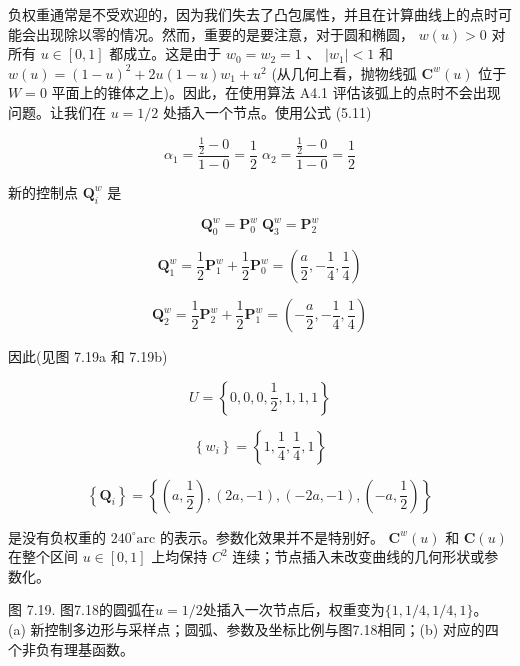 \documentclass[../main.tex]{subfiles}
\begin{document}
负权重通常是不受欢迎的，因为我们失去了凸包属性，并且在计算曲线上的点时可能会出现除以零的情况。然而，重要的是要注意，对于圆和椭圆， \(w\left( u\right)  > 0\) 对所有 \(u \in  \left\lbrack  {0,1}\right\rbrack\) 都成立。这是由于 \({w}_{0} = {w}_{2} = 1\) 、 \(\left| {w}_{1}\right|  < 1\) 和 \(w\left( u\right)  = {\left( 1 - u\right) }^{2} + {2u}\left( {1 - u}\right) {w}_{1} + {u}^{2}\) (从几何上看，抛物线弧 \({\mathbf{C}}^{w}\left( u\right)\) 位于 \(W = 0\) 平面上的锥体之上)。因此，在使用算法 A4.1 评估该弧上的点时不会出现问题。让我们在 \(u = 1/2\) 处插入一个节点。使用公式 (5.11)

\[
{\alpha }_{1} = \frac{\frac{1}{2} - 0}{1 - 0} = \frac{1}{2}\;{\alpha }_{2} = \frac{\frac{1}{2} - 0}{1 - 0} = \frac{1}{2}
\]



新的控制点 \({\mathbf{Q}}_{i}^{w}\) 是

\[
{\mathbf{Q}}_{0}^{w} = {\mathbf{P}}_{0}^{w}\;{\mathbf{Q}}_{3}^{w} = {\mathbf{P}}_{2}^{w}
\]

\[
{\mathbf{Q}}_{1}^{w} = \frac{1}{2}{\mathbf{P}}_{1}^{w} + \frac{1}{2}{\mathbf{P}}_{0}^{w} = \left( {\frac{a}{2}, - \frac{1}{4},\frac{1}{4}}\right)
\]

\[
{\mathbf{Q}}_{2}^{w} = \frac{1}{2}{\mathbf{P}}_{2}^{w} + \frac{1}{2}{\mathbf{P}}_{1}^{w} = \left( {-\frac{a}{2}, - \frac{1}{4},\frac{1}{4}}\right)
\]

因此(见图 7.19a 和 7.19b)

\[
U = \left\{  {0,0,0,\frac{1}{2},1,1,1}\right\}
\]

\[
\left\{  {w}_{i}\right\}   = \left\{  {1,\frac{1}{4},\frac{1}{4},1}\right\}
\]

\[
\left\{  {\mathbf{Q}}_{i}\right\}   = \left\{  {\left( {a,\frac{1}{2}}\right) ,\left( {{2a}, - 1}\right) ,\left( {-{2a}, - 1}\right) ,\left( {-a,\frac{1}{2}}\right) }\right\}
\]

是没有负权重的 \({240}^{ \circ  }\mathrm{{arc}}\) 的表示。参数化效果并不是特别好。 \(\mathbf C^w(u)\) 和 \(\mathbf C(u)\) 在整个区间 \(u\in[0,1]\) 上均保持 \(C^2\) 连续；节点插入未改变曲线的几何形状或参数化。



\begin{center}
\begin{minipage}{37cm}
\vspace*{.6\baselineskip}
\centering
{}
\par\smallskip
图 7.19. 图7.18的圆弧在$u=1/2$处插入一次节点后，权重变为$\{1,1/4,1/4,1\}$。\\
(a) 新控制多边形与采样点；圆弧、参数及坐标比例与图7.18相同；(b) 对应的四个非负有理基函数。
\end{minipage}
\end{center}
\end{document}
